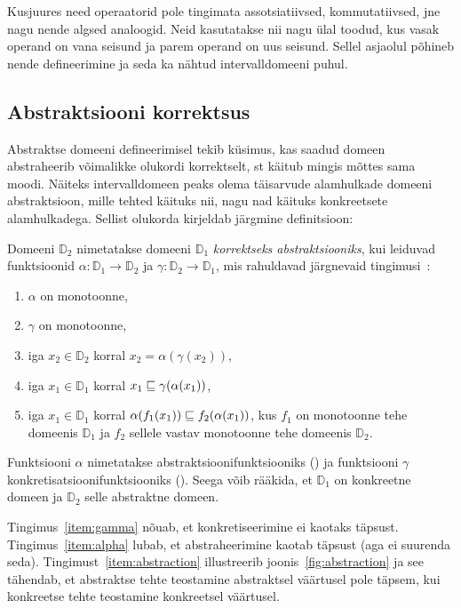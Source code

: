 \documentclass[../thesis.tex]{subfiles}
\begin{document}
Kusjuures need operaatorid pole tingimata assotsiatiivsed, kommutatiivsed, jne nagu nende algsed analoogid. Neid kasutatakse nii nagu ülal toodud, kus vasak operand on vana seisund ja parem operand on uus seisund. Sellel asjaolul põhineb nende defineerimine ja seda ka nähtud intervalldomeeni puhul.

\subsection{Abstraktsiooni korrektsus}
\label{sec:abstraction-props}
Abstraktse domeeni defineerimisel tekib küsimus, kas saadud domeen abstraheerib võimalikke olukordi korrektselt, st käitub mingis mõttes sama moodi. Näiteks intervalldomeen peaks olema täisarvude alamhulkade domeeni abstraktsioon, mille tehted käituks nii, nagu nad käituks konkreetsete alamhulkadega. Sellist olukorda kirjeldab järgmine definitsioon:
\begin{definition}
\label{def:abstraction}
Domeeni $\mathbb{D}_2$ nimetatakse domeeni $\mathbb{D}_1$ \emph{korrektseks abstraktsiooniks}, kui leiduvad funktsioonid $\alpha: \mathbb{D}_1 \to \mathbb{D}_2$ ja $\gamma: \mathbb{D}_2 \to \mathbb{D}_1$, mis rahuldavad järgnevaid tingimusi~\cite[242]{cousot77}:
\begin{enumerate}[nosep]
	\item $\alpha$ on monotoonne, \label{item:alphamono}
	\item $\gamma$ on monotoonne,
	\item iga $x_2 \in \mathbb{D}_2$ korral $x_2 = \alpha (\gamma (x_2))$, \label{item:gamma}
	\item iga $x_1 \in \mathbb{D}_1$ korral $x_1 \sqsubseteq \gamma (\alpha (x_1))$, \label{item:alpha}
	\item iga $x_1 \in \mathbb{D}_1$ korral $\alpha (f_1 (x_1)) \sqsubseteq f_2 (\alpha (x_1))$, kus $f_1$ on monotoonne tehe domeenis $\mathbb{D}_1$ ja $f_2$ sellele vastav monotoonne tehe domeenis $\mathbb{D}_2$. \label{item:abstraction}
\end{enumerate}
\end{definition}
Funktsiooni $\alpha$ nimetatakse abstraktsioonifunktsiooniks () ja funktsiooni $\gamma$ konkretisatsioonifunktsiooniks ().
Seega võib rääkida, et $\mathbb{D}_1$ on konkreetne domeen ja $\mathbb{D}_2$ selle abstraktne domeen.

Tingimus~\ref{item:gamma} nõuab, et konkretiseerimine ei kaotaks täpsust.
Tingimus~\ref{item:alpha} lubab, et abstraheerimine kaotab täpsust (aga ei suurenda seda).
Tingimust~\ref{item:abstraction} illustreerib joonis~\ref{fig:abstraction} ja see tähendab, et abstraktse tehte teostamine abstraktsel väärtusel pole täpsem, kui konkreetse tehte teostamine konkreetsel väärtusel.
\end{document}

